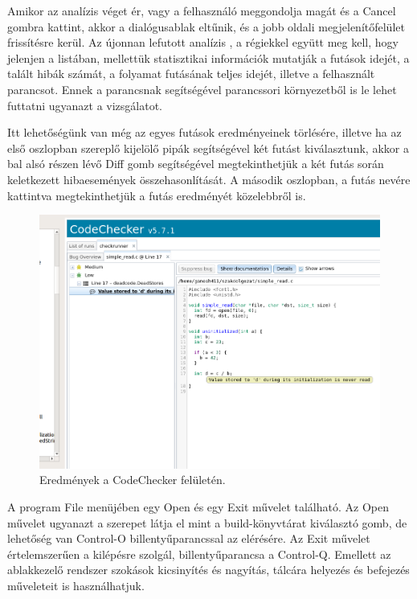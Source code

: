 \documentclass[a4paper,12pt]{report}
\begin{document}
Amikor az analízis véget ér, vagy a felhasználó meggondolja magát és a Cancel gombra kattint, akkor a dialógusablak eltűnik, és a jobb oldali megjelenítőfelület frissítésre kerül. Az újonnan lefutott analízis , a régiekkel együtt meg kell, hogy jelenjen a listában, mellettük statisztikai információk mutatják a futások idejét, a talált hibák számát, a folyamat futásának teljes idejét, illetve a felhasznált parancsot. Ennek a parancsnak segítségével parancssori környezetből is le lehet futtatni ugyanazt a vizsgálatot.

Itt lehetőségünk van még az egyes futások eredményeinek törlésére, illetve ha az első oszlopban szereplő kijelölő pipák segítségével két futást kiválasztunk, akkor a bal alsó részen lévő Diff gomb segítségével megtekinthetjük a két futás során keletkezett hibaesemények összehasonlítását. A második oszlopban, a futás nevére kattintva megtekinthetjük a futás eredményét közelebbről is.

\begin{figure}[h]
\caption{Eredmények a CodeChecker felületén.}
\centering
\includegraphics[scale=0.4]{ui_results_open.png}
\end{figure}

A program File menüjében egy Open és egy Exit művelet található. Az Open művelet ugyanazt a szerepet látja el mint a build-könyvtárat kiválasztó gomb, de lehetőség van Control-O billentyűparancssal az elérésére. Az Exit művelet értelemszerűen a kilépésre szolgál, billentyűparancsa a Control-Q. Emellett az ablakkezelő rendszer szokások kicsinyítés és nagyítás, tálcára helyezés és befejezés műveleteit is használhatjuk.
\end{document}
